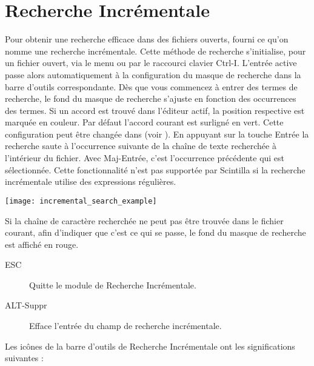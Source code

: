 \section{Recherche Incrémentale}

Pour obtenir une recherche efficace dans des fichiers ouverts, \codeblocks fourni ce qu'on nomme une recherche incrémentale. Cette méthode de recherche s'initialise, pour un fichier ouvert, via le menu  ou par le raccourci clavier Ctrl-I. L'entrée active passe alors automatiquement à la configuration du masque de recherche dans la barre d’outils correspondante. Dès que vous commencez à entrer des termes de recherche, le fond du masque de recherche s'ajuste en fonction des occurrences des termes. Si un accord est trouvé dans l'éditeur actif, la position respective est marquée en couleur. Par défaut l'accord courant est surligné en vert. Cette configuration peut être changée dans  (voir ). En appuyant sur la touche Entrée la recherche saute à l'occurrence suivante de la chaîne de texte recherchée à l'intérieur du fichier. Avec Maj-Entrée, c'est l'occurrence précédente qui est sélectionnée. Cette fonctionnalité n'est pas supportée par Scintilla si la recherche incrémentale utilise des expressions régulières.

\texttt{[image: incremental\_search\_example]}

Si la chaîne de caractère recherchée ne peut pas être trouvée dans le fichier courant, afin d'indiquer que c'est ce qui se passe, le fond du masque de recherche est affiché en rouge.


\begin{description}
\item[ESC] Quitte le module de Recherche Incrémentale.
\item[ALT-Suppr] Efface l'entrée du champ de recherche incrémentale.
\end{description}

Les icônes de la barre d’outils de Recherche Incrémentale ont les significations suivantes :

